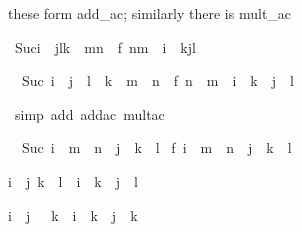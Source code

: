 \begin{isabellebody}
\begin{isamarkuptext}
these form add_ac; similarly there is mult_ac%
\end{isamarkuptext}%
\ {\isachardoublequote}Suc{\isacharparenleft}i\ {\isacharplus}\ j{\isacharasterisk}l{\isacharasterisk}k\ {\isacharplus}\ m{\isacharasterisk}n{\isacharparenright}\ {\isacharequal}\ f\ {\isacharparenleft}n{\isacharasterisk}m\ {\isacharplus}\ i\ {\isacharplus}\ k{\isacharasterisk}j{\isacharasterisk}l{\isacharparenright}{\isachardoublequote}%
\begin{isamarkuptxt}%
\begin{isabelle}%
\ {}{\isachardot}\ Suc\ {\isacharparenleft}i\ {\isacharplus}\ j\ {\isacharasterisk}\ l\ {\isacharasterisk}\ k\ {\isacharplus}\ m\ {\isacharasterisk}\ n{\isacharparenright}\ {\isacharequal}\ f\ {\isacharparenleft}n\ {\isacharasterisk}\ m\ {\isacharplus}\ i\ {\isacharplus}\ k\ {\isacharasterisk}\ j\ {\isacharasterisk}\ l{\isacharparenright}%
\end{isabelle}%
\end{isamarkuptxt}%
\ {\isacharparenleft}simp\ add{\isacharcolon}\ add{\isacharunderscore}ac\ mult{\isacharunderscore}ac{\isacharparenright}%
\begin{isamarkuptxt}%
\begin{isabelle}%
\ {}{\isachardot}\ Suc\ {\isacharparenleft}i\ {\isacharplus}\ {\isacharparenleft}m\ {\isacharasterisk}\ n\ {\isacharplus}\ j\ {\isacharasterisk}\ {\isacharparenleft}k\ {\isacharasterisk}\ l{\isacharparenright}{\isacharparenright}{\isacharparenright}\ {\isacharequal}\isanewline
{}f\ {\isacharparenleft}i\ {\isacharplus}\ {\isacharparenleft}m\ {\isacharasterisk}\ n\ {\isacharplus}\ j\ {\isacharasterisk}\ {\isacharparenleft}k\ {\isacharasterisk}\ l{\isacharparenright}{\isacharparenright}{\isacharparenright}%
\end{isabelle}%
\end{isamarkuptxt}%
%
\begin{isamarkuptext}%
\begin{isabelle}%
{\isasymlbrakk}i\ {\isasymle}\ j{\isacharsemicolon}\ k\ {\isasymle}\ l{\isasymrbrakk}\ {\isasymLongrightarrow}\ i\ {\isacharasterisk}\ k\ {\isasymle}\ j\ {\isacharasterisk}\ l%
\end{isabelle}

\begin{isabelle}%
{\isasymlbrakk}i\ {\isacharless}\ j{\isacharsemicolon}\ {}\ {\isacharless}\ k{\isasymrbrakk}\ {\isasymLongrightarrow}\ i\ {\isacharasterisk}\ k\ {\isacharless}\ j\ {\isacharasterisk}\ k%
\end{isabelle}


\end{isamarkuptext}
\end{isabellebody}
